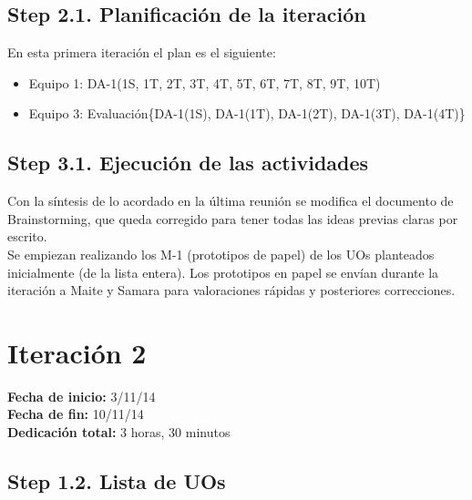\subsection{Step 2.1. Planificación de la iteración}
\label{it1:2.1}

En esta primera iteración el plan es el siguiente:

\begin{itemize}
\item Equipo 1: DA-1(1S, 1T, 2T, 3T, 4T, 5T, 6T, 7T, 8T, 9T, 10T)
\item Equipo 3: Evaluación\{DA-1(1S), DA-1(1T), DA-1(2T), DA-1(3T), DA-1(4T)\}
\end{itemize}

\subsection{Step 3.1. Ejecución de las actividades}
\label{it1:3.1}

Con la síntesis de lo acordado en la última reunión se modifica el documento de Brainstorming, que queda corregido para tener todas las ideas previas claras por escrito.\\

Se empiezan realizando los M-1 (prototipos de papel) de los UOs planteados inicialmente (de la lista entera). Los prototipos en papel se envían durante la iteración a Maite y Samara para valoraciones rápidas y posteriores correcciones.\\


\section{Iteración 2}
\label{it2}

\begin{flushleft}
\textbf{Fecha de inicio:} 3/11/14\\
\textbf{Fecha de fin:} 10/11/14\\
\textbf{Dedicación total:} 3 horas, 30 minutos\\
\end{flushleft}

\subsection{Step 1.2. Lista de UOs}
\label{it2:1.2}

